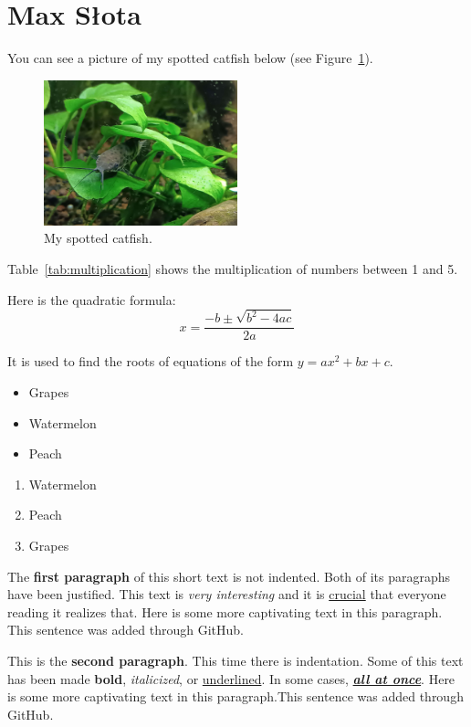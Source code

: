 \section{Max Słota}
\label{sec:slotamax}

You can see a picture of my spotted catfish below (see Figure~\ref{fig:fish}).

\begin{figure}[htbp]
    \centering
    \includegraphics[width=0.5\textwidth]{pictures/fish.jpg}
    \caption{My spotted catfish.}
    \label{fig:fish}
\end{figure}

Table~\ref{tab:multiplication} shows the multiplication of numbers between 1 and 5.


Here is the quadratic formula: \[x=\frac{-b\pm\sqrt{b^2-4ac}}{2a}\]

It is used to find the roots of equations of the form $y=ax^2+bx+c$.

\newpage
{}
\begin{itemize}
\renewcommand\labelitemi{+}
    \item Grapes
    \item Watermelon
    \item Peach
\end{itemize}

\begin{enumerate}
    \item Watermelon
    \item Peach
    \item Grapes
\end{enumerate}

\vspace{5mm}\noindent The \textbf{first paragraph} of this short text is not indented. Both of its paragraphs have been justified. This text is \emph{very interesting} and it is \underline{crucial} that everyone reading it realizes that. Here is some more captivating text in this paragraph. This sentence was added through GitHub.

This is the \textbf{second paragraph}. This time there is indentation. Some of this text has been made \textbf{bold}, \textit{italicized}, or \underline{underlined}. In some cases, \textbf{\emph{\underline{all at once}}}. Here is some more captivating text in this paragraph.This sentence was added through GitHub.
